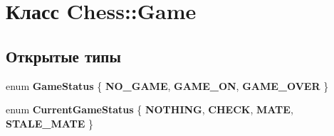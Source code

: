 \hypertarget{class_chess_1_1_game}{}\section{Класс Chess\+:\+:Game}
\label{class_chess_1_1_game}
\subsection*{Открытые типы}
\begin{DoxyCompactItemize}
\item 
\mbox{\label{class_chess_1_1_game_a46c61f3f01bbe9e153de2d0fb17be7a3}} 
enum {\bfseries Game\+Status} \{ {\bfseries N\+O\+\_\+\+G\+A\+ME}, 
{\bfseries G\+A\+M\+E\+\_\+\+ON}, 
{\bfseries G\+A\+M\+E\+\_\+\+O\+V\+ER}
 \}
\item 
\mbox{\label{class_chess_1_1_game_acf87322c373bb63671b87c5a6b68129d}} 
enum {\bfseries Current\+Game\+Status} \{ {\bfseries N\+O\+T\+H\+I\+NG}, 
{\bfseries C\+H\+E\+CK}, 
{\bfseries M\+A\+TE}, 
{\bfseries S\+T\+A\+L\+E\+\_\+\+M\+A\+TE}
 \}
\end{DoxyCompactItemize}
